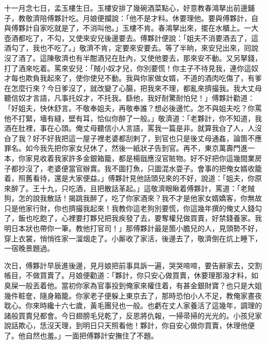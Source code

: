 十一月念七日，孟玉樓生日。玉樓安排了幾碗酒菜點心，好意教春鴻拏出前邊鋪子，教敬濟陪傅夥計吃。月娘便攔說：「他不是才料。休要理他。{}要與傅夥計，自與傅夥計自家吃就是了，不消叫他。」玉樓不肯。{}春鴻拏出來，擺在水櫃上。一大壺酒都吃了，不勾，又使來安兒後邊要去。傅夥計便說：「姐夫不消要酒去了，這酒勾了，我也不吃了。」敬濟不肯，定要來安要去。等了半晌，來安兒出來，囘說沒了酒了。這陳敬濟也有半酣酒兒在肚內，又使他要去，那來安不動。又另拏錢，打了酒來吃着。罵來安兒：「賊小奴才兒，你別要慌！你主子不待見我，連你這奴才每也欺負我起來了，使你使兒不動。我與你家做女婿，不道的酒肉吃傷了，有爹在怎麼行來？今日爹沒了，就改變了心腸，把我來不理，都亂來擠撮我。我大丈母聽信奴才言語，凡事托奴才，不托我。繇他，我好耐驚耐怕兒！」傅夥計勸道：「好姐夫，快休舒言。不敬奉姐夫，再敬奉誰？想必後邊忙。怎不與姐夫吃？你罵他不打緊，墻有縫，壁有耳，恰似你醉了一般。」敬濟道：「老夥計，你不知道，我酒在肚裡，事在心頭。俺丈母聽信小人言語，罵我一篇是非。就算我㒲了人，人沒㒲了我？好不好我把這一屋子裡老婆都刮剌了，到官也只是後丈母通姦，論箇不應罪名。如今我先把你家女兒休了，然後一紙狀子告到官。再不，東京萬壽門進一本，你家見收着我家許多金銀箱籠，都是楊戩應沒官賍物。好不好把你這幾間業房子都抄沒了，老婆便當官辦賣。我不圖打魚，只圖混水耍子。{}會事的把俺女婿收籠着，照舊看待，還是大家便益。」傅夥計見他話頭兒來的不好，說道：「姐夫，你原來醉了。王十九，只吃酒，且把散話革起。」這敬濟眼瞅着傅夥計，罵道：「老賊狗，怎的說我散話！揭跳我醉了，吃了你家酒來？我不才是他家女婿嬌客，你無故只是他家行財，你也擠撮我起來！我教你這老狗別要慌，你這幾年撰的俺丈人錢勾了，飯也吃飽了，心裡要打夥兒把我疾發了去，要奪權兒做買賣，好禁錢養家。{}我明日本狀也帶你一筆。教他打官司！」{}那傅夥計最是箇小膽兒的人，見頭勢不好，穿上衣裳，悄悄徃家一溜烟走了。小厮收了家活，後邊去了，敬濟倒在炕上睡下，一宿晚景題過。

次日，傅夥計早辰進後邊，見月娘把前事具訴一遍，哭哭啼啼，要告辭家去，交割帳目，不做買賣了。月娘便勸道：「夥計，你只安心做買賣，休要理那潑才料，如臭屎一般丟着他。當初你家為官事投到俺家來權住着，{}有甚金銀財寶？也只是大姐幾件粧奩，隨身箱籠。你家老子便躲上東京去了，那時恐怕小人不足，教俺家晝夜耽心。你來時纔十六七歲，黃毛團兒也一般。也虧在丈人家養活了這幾年，調理的諸般買賣兒都會。今日翅膀毛兒乾了，反恩將仇報，一掃帚掃的光光的。小孩兒家說話欺心，恁沒天理，到明日只天照看他！夥計，你自安心做你買賣，休理他便了。他自然也羞。」一面把傅夥計安撫住了不題。

